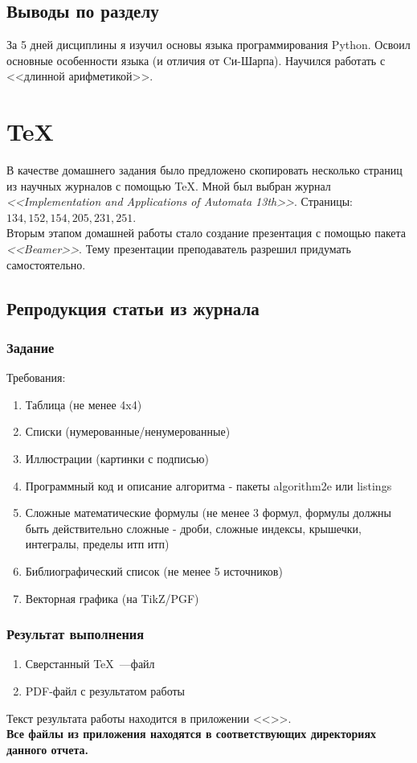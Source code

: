 \documentclass[a4paper,12pt]{article}
\begin{document}
\subsection{Выводы по разделу}
За 5 дней дисциплины я изучил основы языка программирования Python. Освоил основные особенности языка (и отличия от Cи-Шарпа). Научился работать с <<длинной арифметикой>>.

\newpage

\section{\TeX}
\label{sec:tex}
В качестве домашнего задания было предложено скопировать несколько страниц из научных журналов с помощью \TeX . Мной был выбран журнал \textit{<<Implementation and Applications of Automata 13th>>}. Страницы: $134, 152, 154, 205, 231, 251$.\\
\indent Вторым этапом домашней работы стало создание презентация с помощью пакета \textit{<<Beamer>>}. Тему презентации преподаватель разрешил придумать самостоятельно.  
\subsection{Репродукция статьи из журнала}
\subsubsection{Задание}
Требования:
\begin{enumerate}
	\item Таблица (не менее 4x4)
	\item Списки (нумерованные/ненумерованные)
	\item Иллюстрации (картинки с подписью)
	\item Программный код и описание алгоритма - пакеты algorithm2e или listings
	\item Сложные математические формулы (не менее 3 формул, формулы должны быть действительно сложные - дроби, сложные индексы, крышечки, интегралы, пределы итп итп)
	\item Библиографический список (не менее 5 источников)
	\item Векторная графика (на TikZ/PGF)
\end{enumerate}

\subsubsection{Результат выполнения}
\begin{enumerate}
	\item Сверстанный {\TeX}~---файл 
	\item PDF-файл с результатом работы
\end{enumerate}
Текст результата работы находится в приложении <<>>.\medskip \\
\textbf{Все файлы из приложения находятся в соответствующих директориях данного отчета.}
\end{document}
